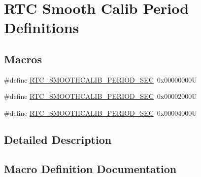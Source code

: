 \hypertarget{group___r_t_c_ex___smooth__calib__period___definitions}{}\section{R\+TC Smooth Calib Period Definitions}
\label{group___r_t_c_ex___smooth__calib__period___definitions}
\subsection*{Macros}
\begin{DoxyCompactItemize}
\item 
\#define \hyperlink{group___r_t_c_ex___smooth__calib__period___definitions_gaab8a844313898595cd72f86570198e5a}{R\+T\+C\+\_\+\+S\+M\+O\+O\+T\+H\+C\+A\+L\+I\+B\+\_\+\+P\+E\+R\+I\+O\+D\+\_\+S\+EC}~0x00000000U
\item 
\#define \hyperlink{group___r_t_c_ex___smooth__calib__period___definitions_ga0c192bdebd2496f60b8a4aa7db499262}{R\+T\+C\+\_\+\+S\+M\+O\+O\+T\+H\+C\+A\+L\+I\+B\+\_\+\+P\+E\+R\+I\+O\+D\+\_\+S\+EC}~0x00002000U
\item 
\#define \hyperlink{group___r_t_c_ex___smooth__calib__period___definitions_ga0993db27ee5b25c8db41c8e58b478ffe}{R\+T\+C\+\_\+\+S\+M\+O\+O\+T\+H\+C\+A\+L\+I\+B\+\_\+\+P\+E\+R\+I\+O\+D\+\_\+S\+EC}~0x00004000U
\end{DoxyCompactItemize}


\subsection{Detailed Description}


\subsection{Macro Definition Documentation}
\mbox{\label{group___r_t_c_ex___smooth__calib__period___definitions_ga0c192bdebd2496f60b8a4aa7db499262}} 
